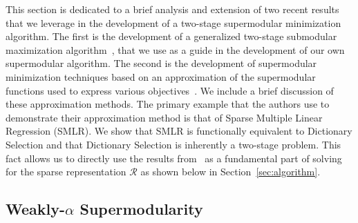 \documentclass{article}
\newcommand{\Rr}{\mathcal{R}}
\begin{document}
This section is dedicated to a brief analysis and extension of two recent results that we leverage in the development of a two-stage supermodular minimization algorithm. The first is the development of a generalized two-stage submodular maximization algorithm~\cite{Singer16TwoStage}, that we use as a guide in the development of our own supermodular algorithm. The second is the development of supermodular minimization techniques based on an approximation of the supermodular functions used to express various objectives~\cite{weaklyalpha}. We include a brief discussion of these approximation methods. The primary example that the authors use to demonstrate their approximation method is that of Sparse Multiple Linear Regression (SMLR). We show that SMLR is functionally equivalent to Dictionary Selection and that Dictionary Selection is inherently a two-stage problem. This fact allows us to directly use the results from~\cite{weaklyalpha} as a fundamental part of solving for the sparse representation $\Rr$ as shown below in Section~\ref{sec:algorithm}.

\subsection{Weakly-$\alpha$ Supermodularity} \label{weakalpha}
\end{document}
